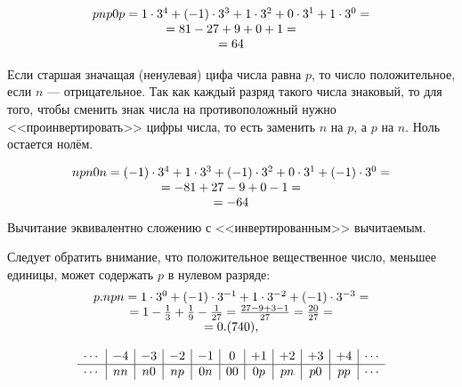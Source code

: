 \begin{exampl} 
    \label{ex:ch:ss:positiveDigit}
    \[
        \begin{array}[c]{c}
            pnp0p=
            1\cdot 3^{4} +
            (-1)\cdot 3^{3} +
            1\cdot 3^{2} +
            0\cdot 3^{1} +
            1\cdot 3^{0} = \\
            = 81-27+9+0+1= \\
            = 64
        \end{array}
    \]
\end{exampl}

Если старшая значащая (ненулевая) цифа числа равна $p$, то число положительное, если $n$ --- отрицательное. Так как каждый разряд такого числа знаковый, то для того, чтобы сменить знак числа на противоположный нужно <<проинвертировать>> цифры числа, то есть заменить $n$ на $p$, а $p$ на $n$. Ноль остается нолём. 

\begin{exampl}
    \[
        \begin{array}[c]{c}
            npn0n=
            (-1)\cdot 3^{4} +
            1\cdot 3^{3} +
            (-1)\cdot 3^{2} +
            0\cdot 3^{1} +
            (-1) \cdot 3^{0} = \\
            = -81+27-9+0-1= \\
            = -64
        \end{array}
    \]
    Вычитание эквивалентно сложению с <<инвертированным>> вычитаемым.
\end{exampl}

Следует обратить внимание, что положительное вещественное число, меньшее единицы, может содержать $p$ в нулевом разряде:
\[
    \begin{array}[c]{c}
        p.npn=
        1\cdot 3^{0} +
        (-1)\cdot 3^{-1} +
        1\cdot 3^{-2} +
        (-1)\cdot 3^{-3} = \\
        = 1-\frac{1}{3}+\frac{1}{9}-\frac{1}{27} 
        = \frac{27-9+3-1}{27}
        = \frac{20}{27}=\\
        =0.(740),
    \end{array}
\]

\begin{exampl}
    \[
        \begin{array}[c]{c|c|c|c|c|c|c|c|c|c|c}
            \cdots & -4 & -3 & -2 & -1 & 0  & +1 & +2 & +3 & +4  & \cdots\\
            \hline
            \cdots & nn & n0 & np & 0n & 00 & 0p & pn & p0 & pp & \cdots\\
        \end{array}
    \]
\end{exampl}


